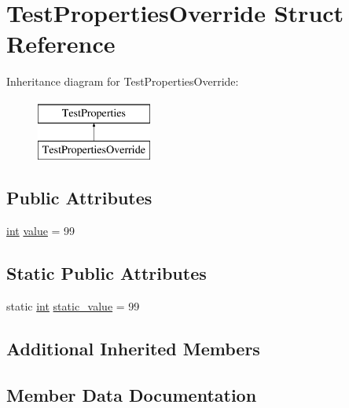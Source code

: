\hypertarget{struct_test_properties_override}{}\section{Test\+Properties\+Override Struct Reference}
\label{struct_test_properties_override}
Inheritance diagram for Test\+Properties\+Override\+:\begin{figure}[H]
\begin{center}
\leavevmode
\includegraphics[height=2.000000cm]{struct_test_properties_override}
\end{center}
\end{figure}
\subsection*{Public Attributes}
\begin{DoxyCompactItemize}
\item 
\mbox{\hyperlink{warnings_8h_a74f207b5aa4ba51c3a2ad59b219a423b}{int}} \mbox{\hyperlink{struct_test_properties_override_ac1fe1c62595fe8cf976615f8a12b332f}{value}} = 99
\end{DoxyCompactItemize}
\subsection*{Static Public Attributes}
\begin{DoxyCompactItemize}
\item 
static \mbox{\hyperlink{warnings_8h_a74f207b5aa4ba51c3a2ad59b219a423b}{int}} \mbox{\hyperlink{struct_test_properties_override_a00d8530eb034b8d0cf7501a7406f61ef}{static\+\_\+value}} = 99
\end{DoxyCompactItemize}
\subsection*{Additional Inherited Members}


\subsection{Member Data Documentation}
\mbox{\label{struct_test_properties_override_a00d8530eb034b8d0cf7501a7406f61ef}} 
